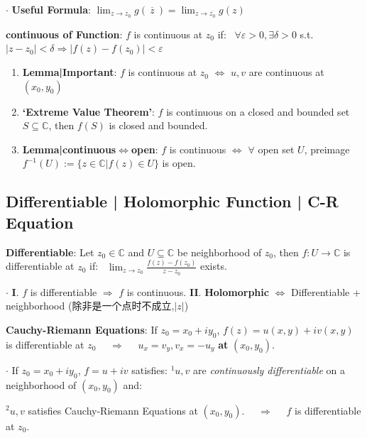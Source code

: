 \documentclass[9pt]{article}
\begin{document}
$\cdot$ \textbf{Useful Formula}: $\lim_{z\to z_0}g(\ \overline{z} \ )=\lim_{z\to\overline{z_0}}g(z)$

\textbf{continuous of Function}: $f$ is continuous at $z_0$ if: \ $\forall\varepsilon>0,\exists\delta>0$ s.t. $|z-z_0|<\delta\Rightarrow |f(z)-f(z_0)|<\varepsilon$ 

\begin{enumerate}[itemsep=-2pt, topsep=-2pt]
    \item \textbf{Lemma|Important}: $f$ is continuous at $z_0$ $\Leftrightarrow$ $u,v$ are continuous at $(x_0,y_0)$
    \item \textbf{`Extreme Value Theorem'}: $f$ is continuous on a closed and bounded set $S\subseteq\mathbb{C}$, then $f(S)$ is closed and bounded.
    \item \textbf{Lemma|continuous$\Leftrightarrow$open}: $f$ is continuous $\Leftrightarrow$ $\forall$ open set $U$, preimage $f^{-1}(U):=\{z\in\mathbb{C}|f(z)\in U\}$ is open.
\end{enumerate}


\subsection{Differentiable | Holomorphic Function | C-R Equation} %

\textbf{Differentiable}: Let $z_0\in\mathbb{C}$ and $U\subseteq\mathbb{C}$ be neighborhood of $z_0$, then $f:U\to\mathbb{C}$ is differentiable at $z_0$ if: \ $\lim_{z\to z_0}\frac{f(z)-f(z_0)}{z-z_0}$ exists.

$\cdot$ \textbf{I}. $f$ is differentiable $\Rightarrow$ $f$ is continuous. \quad \quad \textbf{II}. \textbf{Holomorphic} $\Leftrightarrow$ {\small Differentiable + neighborhood} {\tiny (除非是一个点时不成立,$|z|$)} 

\textbf{Cauchy-Riemann Equations}: If $z_0=x_0+iy_0$, $f(z)=u(x,y)+iv(x,y)$ is differentiable at $z_0$ \ \ $\Rightarrow$ \ \ $u_x=v_y,v_x=-u_y$ \textbf{at} $(x_0,y_0)$.

$\cdot$ If $z_0=x_0+iy_0$, $f=u+iv$ satisfies: $^1u,v$ are \textit{continuously differentiable} on a neighborhood of $(x_0,y_0)$ and:

\hspace{162pt} $^2u,v$ satisfies Cauchy-Riemann Equations at $(x_0,y_0)$. \ \ $\Rightarrow$ \ \ $f$ is differentiable at $z_0$.
\end{document}
